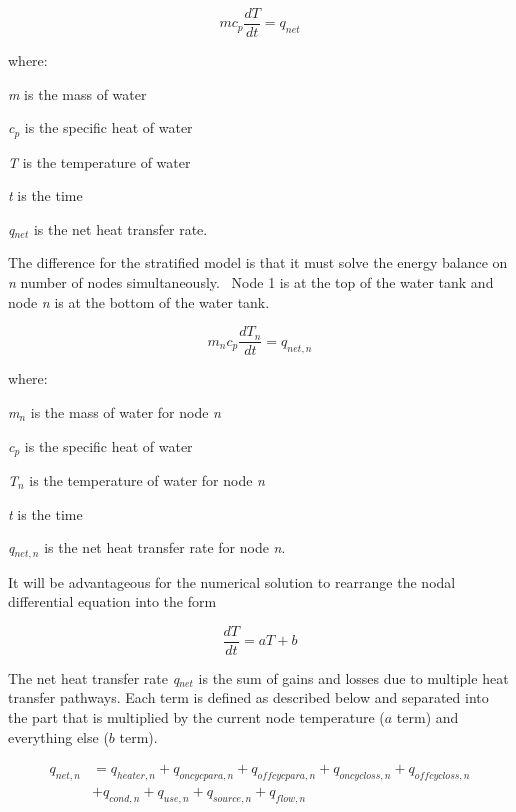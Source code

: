 \begin{equation}
m{c_p}\frac{{dT}}{{dt}} = {q_{net}}
\end{equation}

where:

\emph{m} is the mass of water

\emph{c\(_{p}\)} is the specific heat of water

\emph{T} is the temperature of water

\emph{t} is the time

\emph{q\(_{net}\)} is the net heat transfer rate.

The difference for the stratified model is that it must solve the energy balance on \emph{n} number of nodes simultaneously.~ Node 1 is at the top of the water tank and node \emph{n} is at the bottom of the water tank.

\begin{equation}
{m_n}{c_p}\frac{{d{T_n}}}{{dt}} = {q_{net,n}}
\end{equation}

where:

\emph{m\(_{n}\)} is the mass of water for node \emph{n}

\emph{c\(_{p}\)} is the specific heat of water

\emph{T\(_{n}\)} is the temperature of water for node \emph{n}

\emph{t} is the time

\emph{q\(_{net,n}\)} is the net heat transfer rate for node \emph{n}.

It will be advantageous for the numerical solution to rearrange the nodal differential equation into the form

\begin{equation}
  \frac{d{T}}{dt} = a T + b
\end{equation}

The net heat transfer rate \emph{q\(_{net}\)} is the sum of gains and losses due to multiple heat transfer pathways. Each term is defined as described below and separated into the part that is multiplied by the current node temperature ($a$ term) and everything else ($b$ term).

\begin{equation}
  \begin{array}{ll}
    q_{net,n} &= q_{heater,n} + q_{oncycpara,n} + q_{offcycpara,n} + q_{oncycloss,n} + q_{offcycloss,n} \\ 
              &+ q_{cond,n} + q_{use,n} + q_{source,n} + q_{flow,n}
  \end{array}
\end{equation}

